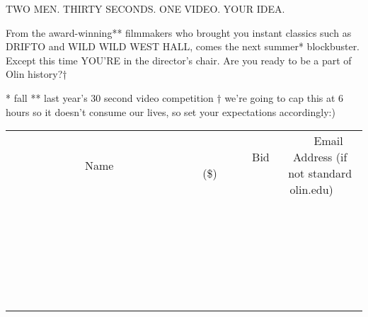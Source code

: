\documentclass[11pt]{article}
\begin{document}
TWO MEN.
THIRTY SECONDS.
ONE VIDEO.
YOUR IDEA.

From the award-winning** filmmakers who brought you instant classics such as DRIFTO and WILD WILD WEST HALL, comes the next summer* blockbuster. Except this time YOU'RE in the director's chair. Are you ready to be a part of Olin history?†



* fall
** last year's 30 second video competition
† we're going to cap this at 6 hours so it doesn't consume our lives, so set your expectations accordingly:) \\[6ex]
\begin{tabular}{c c c}
~~~~~~~~~~~~~Name~~~~~~~~~~~~~ & ~~~~~~~~~Bid (\$)~~~~~~~~~ & ~~~Email Address (if not standard olin.edu)~~~ \\
 & & \\
\hline
 & & \\
\hline
 & & \\
\hline
 & & \\
\hline
 & & \\
\hline
 & & \\
\hline
 & & \\
\hline
 & & \\
\hline
 & & \\
\hline
 & & \\
\hline
 & & \\
\hline
 & & \\
\hline
 & & \\
\hline
 & & \\
\hline
 & & \\
\hline
 & & \\
\hline
 & & \\
\hline
 & & \\
\hline
 & & \\
\hline
 & & \\
\hline
 & & \\
\hline
 & & \\
\hline
 & & \\
\hline
 & & \\
\hline
 & & \\
\hline
 & & \\
\hline
\end{tabular}
\clearpage
\end{document}
